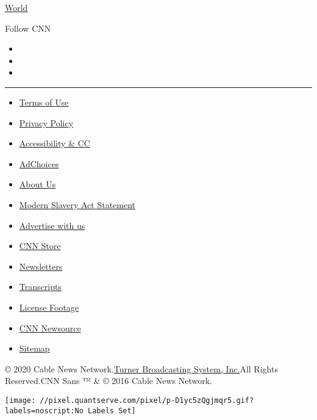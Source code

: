\href{/world}{World}

Follow CNN

\begin{itemize}
\item
\item
\item
\end{itemize}

\begin{center}\rule{0.5\linewidth}{\linethickness}\end{center}

\begin{itemize}
\tightlist
\item
  \href{/terms}{Terms of Use}
\item
  \href{/privacy}{Privacy Policy}
\item
  \href{/accessibility}{Accessibility \& CC}
\item
  \protect\hyperlink{}{AdChoices}
\item
  \href{/about}{About Us}
\item
  \href{/msa}{Modern Slavery Act Statement}
\item
  \href{https://commercial.cnn.com}{Advertise with us}
\item
  \href{//store.cnn.com}{CNN Store}
\item
  \href{/newsletters}{Newsletters}
\item
  \href{/transcripts}{Transcripts}
\item
  \href{/collection}{License Footage}
\item
  \href{http://cnnnewsource.com}{CNN Newsource}
\item
  \href{https://www.cnn.com/sitemap.html}{Sitemap}
\end{itemize}

© 2020 Cable News Network.\href{//www.turner.com}{Turner Broadcasting
System, Inc.}All Rights Reserved.CNN Sans ™ \& © 2016 Cable News
Network.

\texttt{[image: //pixel.quantserve.com/pixel/p-D1yc5zQgjmqr5.gif?labels=noscript:No Labels Set]}
